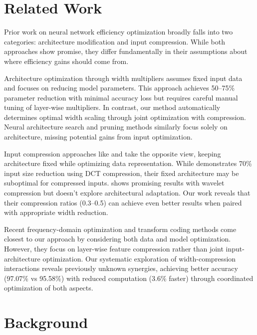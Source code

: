 \documentclass{article} %
\begin{document}
\section{Related Work}
\label{sec:related}

Prior work on neural network efficiency optimization broadly falls into two categories: architecture modification and input compression. While both approaches show promise, they differ fundamentally in their assumptions about where efficiency gains should come from.

Architecture optimization through width multipliers \citep{Howard2017MobileNetsEC} assumes fixed input data and focuses on reducing model parameters. This approach achieves 50--75\% parameter reduction with minimal accuracy loss but requires careful manual tuning of layer-wise multipliers. In contrast, our method automatically determines optimal width scaling through joint optimization with compression. Neural architecture search \citep{Zoph2016NeuralAS} and pruning methods \citep{Han2015DeepCC} similarly focus solely on architecture, missing potential gains from input optimization.

Input compression approaches like \citet{wang2022learning} and \citet{azimi2020structural} take the opposite view, keeping architecture fixed while optimizing data representation. While \citet{wang2022learning} demonstrates 70\% input size reduction using DCT compression, their fixed architecture may be suboptimal for compressed inputs. \citet{azimi2020structural} shows promising results with wavelet compression but doesn't explore architectural adaptation. Our work reveals that their compression ratios (0.3--0.5) can achieve even better results when paired with appropriate width reduction.

Recent frequency-domain optimization \citep{Zeng2021IterativeDM} and transform coding \citep{Shi2023TECOAU} methods come closest to our approach by considering both data and model optimization. However, they focus on layer-wise feature compression rather than joint input-architecture optimization. Our systematic exploration of width-compression interactions reveals previously unknown synergies, achieving better accuracy (97.07\% vs 95.58\%) with reduced computation (3.6\% faster) through coordinated optimization of both aspects.

\section{Background}
\label{sec:background}
\end{document}
